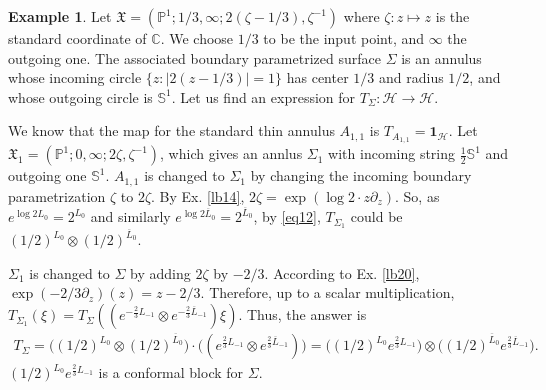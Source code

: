 \documentclass[11pt,b5paper,notitlepage]{article}
\theoremstyle{definition}
\newtheorem{eg}[df]{Example}
\theoremstyle{plain}
\newcommand{\fk}{\mathfrak}
\newcommand{\mc}{\mathcal}
\newcommand{\ovl}{\overline}
\newcommand{\id}{\mathbf{1}}
\newcommand{\Cbb}{\mathbb C}
\newcommand{\Pbb}{\mathbb P}
\newcommand{\Sbb}{{\mathbb S}}
\numberwithin{equation}{section}
\begin{document}
\begin{eg}
Let $\fk X=(\Pbb^1;1/3,\infty;2(\zeta-1/3),\zeta^{-1})$ where $\zeta:z\mapsto z$ is the standard coordinate of $\Cbb$. We choose $1/3$ to be the input point, and $\infty$ the outgoing one. The associated boundary parametrized surface $\Sigma$ is an annulus whose incoming circle $\{z:|2(z-1/3)|=1\}$ has center $1/3$ and radius $1/2$, and whose outgoing circle is $\Sbb^1$. Let us find an expression for $T_\Sigma:\mc H\rightarrow\mc H$.

We know that the map for the standard thin annulus $A_{1,1}$ is $T_{A_{1,1}}=\id_{\mc H}$. Let $\fk X_1=(\Pbb^1;0,\infty;2\zeta,\zeta^{-1})$, which gives an annlus $\Sigma_1$ with incoming string $\frac 12\Sbb^1$ and outgoing one $\Sbb^1$. $A_{1,1}$ is changed to $\Sigma_1$ by changing the incoming boundary parametrization $\zeta$ to $2\zeta$. By Ex. \ref{lb14}, $2\zeta=\exp(\log 2\cdot z\partial_z)$. So, as $e^{\log 2L_0}=2^{L_0}$ and similarly $e^{\log 2 \ovl L_0}=2^{\ovl L_0}$, by \eqref{eq12}, $T_{\Sigma_1}$ could be $(1/2)^{L_0}\otimes (1/2)^{\ovl L_0}$.

$\Sigma_1$ is changed to $\Sigma$ by adding $2\zeta$ by $-2/3$. According to Ex. \ref{lb20},  $\exp(-2/3\partial_z)(z)=z-2/3$. Therefore, up to a scalar multiplication, $T_{\Sigma_1}(\xi)=T_\Sigma((e^{-\frac 23 L_{-1}}\otimes e^{-\frac 23 \ovl L_{-1}})\xi)$. Thus, the answer is
\begin{align*}
T_\Sigma=\big((1/2)^{L_0}\otimes (1/2)^{\ovl L_0}\big)\cdot \big((e^{\frac 23 L_{-1}}\otimes e^{\frac 23 \ovl L_{-1}})\big)=\big((1/2)^{L_0}e^{\frac 23L_{-1}}\big)\otimes 	\big((1/2)^{\ovl L_0}e^{\frac 23\ovl L_{-1}}\big).
\end{align*}
$(1/2)^{L_0}e^{\frac 23L_{-1}}$ is a conformal block for $\Sigma$. \hfill\qedsymbol
\end{eg}










\subsection{}\label{lb28}
\end{document}
